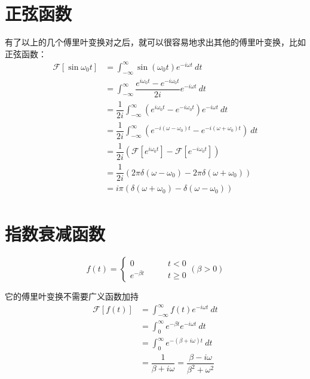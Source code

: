     \section{正弦函数}
        有了以上的几个傅里叶变换对之后，就可以很容易地求出其他的傅里叶变换，比如正弦函数：
        \begin{equation}
            \begin{split}
                \mathscr{F}[\sin \omega_0t]&=\int_{-\infty}^{\infty}\sin(\omega_0t)e^{-i\omega t}\ dt\\
                &=\int_{-\infty}^{\infty}\dfrac{e^{i\omega_0t}-e^{-i\omega_0t}}{2i}e^{-i\omega t}\ dt\\
                &=\dfrac{1}{2i}\int_{-\infty}^{\infty}(e^{i\omega_0t}-e^{-i\omega_0t})e^{-i\omega t}\ dt\\
                &=\dfrac{1}{2i}\int_{-\infty}^{\infty}(e^{-i(\omega - \omega_0)t}-e^{-i(\omega  + \omega_0)t})\ dt\\
                &=\dfrac{1}{2i}(\mathscr{F}[e^{i\omega_0 t}]-\mathscr{F}[e^{-i\omega_0 t}])\\
                &=\dfrac{1}{2i}(2\pi\delta(\omega-\omega_0)-2\pi\delta(\omega+\omega_0))\\
                &=i\pi(\delta(\omega+\omega_0)-\delta(\omega-\omega_0))\\
            \end{split}
            \label{eq: 2.19}
        \end{equation}
    \section{指数衰减函数}
        \begin{equation}
            f(t)=\left\{\begin{aligned}
            0&\qquad t<0\\
            e^{-\beta t}&\qquad t\geq0
            \end{aligned}
            \right.(\beta>0)
            \label{eq: 2.20}
        \end{equation}

        它的傅里叶变换不需要广义函数加持
        \begin{equation}
            \begin{split}
                \mathscr{F}[f(t)]&= \int_{-\infty}^{\infty}f(t)e^{-i\omega t}\ dt\\
                &= \int_{0}^{\infty}e^{-\beta t}e^{-i\omega t}\ dt\\
                &= \int_{0}^{\infty}e^{-(\beta + i\omega) t}\ dt\\
                &= \dfrac{1}{\beta+i\omega}=\dfrac{\beta-i\omega}{\beta^2+\omega^2}
            \end{split}
            \label{eq: 2.21}
        \end{equation}

